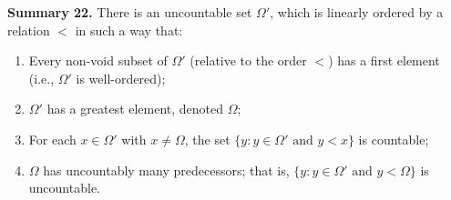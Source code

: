 \textbf{Summary 22.} There is an uncountable set $\Omega'$, which is linearly ordered by a relation $<$ in such a way that:
\begin{enumerate}
\item[(a)] Every non-void subset of $\Omega'$ (relative to the order $<$) has a first element (i.e., $\Omega'$ is well-ordered);
\item[(b)] $\Omega'$ has a greatest element, denoted $\Omega$;
\item[(c)] For each $x \in \Omega'$ with $x \neq \Omega$, the set $\{y : y \in \Omega' \text{ and } y < x\}$ is countable;
\item[(d)] $\Omega$ has uncountably many predecessors; that is, $\{y : y \in \Omega' \text{ and } y < \Omega\}$ is uncountable.
\end{enumerate}
